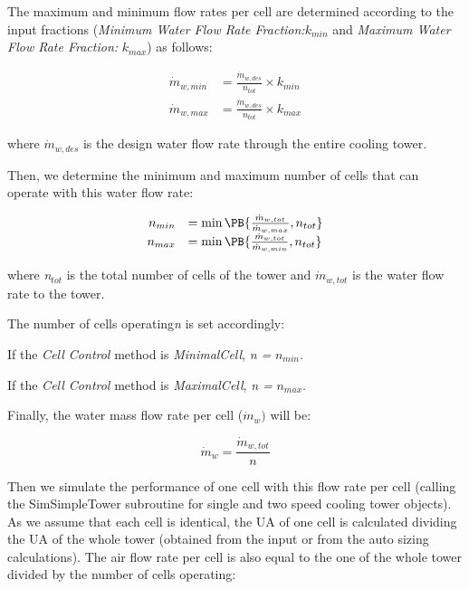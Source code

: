 The maximum and minimum flow rates per cell are determined according to the input fractions (\emph{Minimum Water Flow Rate Fraction:}\({k_{min}}\) and \emph{Maximum Water Flow Rate Fraction:} \({k_{max}}\)) as follows:

\begin{equation}
    \begin{array}{rl}
      \dot{m}_{w,min} &= \frac{\dot{m}_{w,des}}{n_{tot}} \times k_{min} \\
      \dot{m}_{w,max} &= \frac{\dot{m}_{w,des}}{n_{tot}} \times k_{max}
    \end{array}
\end{equation}

where \({{{\dot m}_{w,des}}}\) is the design water flow rate through the entire cooling tower.

Then, we determine the minimum and maximum number of cells that can operate with this water flow rate:

\begin{equation}
    \begin{array}{rl}
      n_{min} & = \min\PB{\frac{\dot{m}_{w,tot}}{\dot{m}_{w,max}},n_{tot}} \\
      n_{max} & = \min\PB{\frac{\dot{m}_{w,tot}}{\dot{m}_{w,min}},n_{tot}}
    \end{array}
\end{equation}

where \emph{n\(_{tot}\)} is the total number of cells of the tower and \({{{\dot m}_{w,tot}}}\) is the water flow rate to the tower.

The number of cells operating\emph{n} is set accordingly:

If the \emph{Cell Control} method is \emph{MinimalCell}, \emph{n =} \({{n_{min}}}\).

If the \emph{Cell Control} method is \emph{MaximalCell}, \emph{n =} \({{n_{max}}}\).

Finally, the water mass flow rate per cell (\({{\dot m}_w})\) will be:

\begin{equation}
{{\dot m}_w} = \frac{{{{\dot m}_{w,tot}}}}{n}
\end{equation}

Then we simulate the performance of one cell with this flow rate per cell (calling the SimSimpleTower subroutine for single and two speed cooling tower objects). As we assume that each cell is identical, the UA of one cell is calculated dividing the UA of the whole tower (obtained from the input or from the auto sizing calculations). The air flow rate per cell is also equal to the one of the whole tower divided by the number of cells operating:

